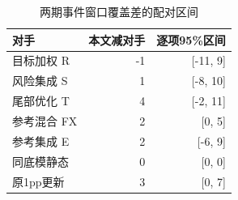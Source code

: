 \begin{table}[H]\centering\caption{两期事件窗口覆盖差的配对区间}
\fontsize{9bp}{12bp}\selectfont
\begin{tabularx}{\linewidth}{@{}Yrr@{}}\toprule
对手 & 本文减对手 & 逐项95\%区间\\\midrule
目标加权 R & -1 & [-11, 9]\\
风险集成 S & 1 & [-8, 10]\\
尾部优化 T & 4 & [-2, 11]\\
参考混合 FX & 2 & [0, 5]\\
参考集成 E & 2 & [-6, 9]\\
同底模静态 & 0 & [0, 0]\\
原1pp更新 & 3 & [0, 7]\\
\bottomrule\end{tabularx}
\end{table}